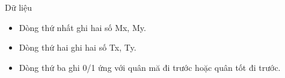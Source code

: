 Dữ liệu  
\begin{itemize}
	\item     Dòng thứ nhất ghi hai số Mx, My.   
	\item     Dòng thứ hai ghi hai số Tx, Ty.   
	\item     Dòng thứ ba ghi 0/1 ứng với quân mă đi trước hoặc quân tốt đi trước.   
\end{itemize}